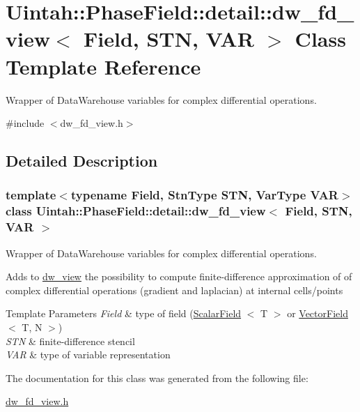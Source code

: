 \hypertarget{classUintah_1_1PhaseField_1_1detail_1_1dw__fd__view}{}\section{Uintah\+:\+:Phase\+Field\+:\+:detail\+:\+:dw\+\_\+fd\+\_\+view$<$ Field, S\+TN, V\+AR $>$ Class Template Reference}
\label{classUintah_1_1PhaseField_1_1detail_1_1dw__fd__view}


Wrapper of Data\+Warehouse variables for complex differential operations.  




{\ttfamily \#include $<$dw\+\_\+fd\+\_\+view.\+h$>$}



\subsection{Detailed Description}
\subsubsection*{template$<$typename Field, Stn\+Type S\+TN, Var\+Type V\+AR$>$\newline
class Uintah\+::\+Phase\+Field\+::detail\+::dw\+\_\+fd\+\_\+view$<$ Field, S\+T\+N, V\+A\+R $>$}

Wrapper of Data\+Warehouse variables for complex differential operations. 

Adds to \hyperlink{classUintah_1_1PhaseField_1_1detail_1_1dw__view}{dw\+\_\+view} the possibility to compute finite-\/difference approximation of of complex differential operations (gradient and laplacian) at internal cells/points


\begin{DoxyTemplParams}{Template Parameters}
{\em Field} & type of field (\hyperlink{structUintah_1_1PhaseField_1_1ScalarField}{Scalar\+Field} $<$ T $>$ or \hyperlink{structUintah_1_1PhaseField_1_1VectorField}{Vector\+Field} $<$ T, N $>$) \\
\hline
{\em S\+TN} & finite-\/difference stencil \\
\hline
{\em V\+AR} & type of variable representation \\
\hline
\end{DoxyTemplParams}


The documentation for this class was generated from the following file\+:\begin{DoxyCompactItemize}
\item 
\hyperlink{dw__fd__view_8h}{dw\+\_\+fd\+\_\+view.\+h}\end{DoxyCompactItemize}
